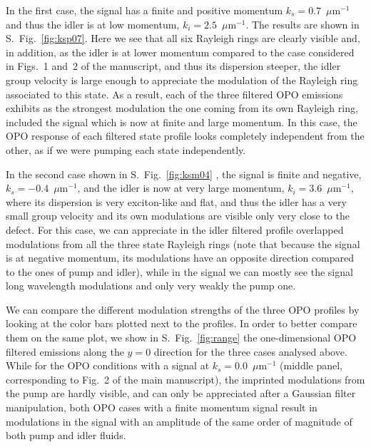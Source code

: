 In the first case, the signal has a finite and positive momentum $k_s
= 0.7$~$\mu$m$^{-1}$ and thus the idler is at low momentum, $k_i
=2.5$~$\mu$m$^{-1}$. The results are shown in S.~Fig.~\ref{fig:ksp07}.
%
Here we see that all six Rayleigh rings are clearly visible and, in
addition, as the idler is at lower momentum compared to the case
considered in Figs.~1 and~2 of the manuscript, and thus its dispersion
steeper, the idler group velocity is large enough to appreciate the
modulation of the Rayleigh ring associated to this state. As a result,
each of the three filtered OPO emissions exhibits as the strongest
modulation the one coming from its own Rayleigh ring, included the
signal which is now at finite and large momentum. In this case, the
OPO response of each filtered state profile looks completely
independent from the other, as if we were pumping each state
independently.

In the second case shown in S.~Fig.~\ref{fig:ksm04} , the signal is
finite and negative, $k_s = -0.4$~$\mu$m$^{-1}$, and the idler is now
at very large momentum, $k_i = 3.6$~$\mu$m$^{-1}$, where its
dispersion is very exciton-like and flat, and thus the idler has a
very small group velocity and its own modulations are visible only
very close to the defect. For this case, we can appreciate in the
idler filtered profile overlapped modulations from all the three state
Rayleigh rings (note that because the signal is at negative momentum,
its modulations have an opposite direction compared to the ones of
pump and idler), while in the signal we can mostly see the signal long
wavelength modulations and only very weakly the pump one.


We can compare the different modulation strengths of the three OPO
profiles by looking at the color bars plotted next to the profiles. In
order to better compare them on the same plot, we show in
S.~Fig.~\ref{fig:range} the one-dimensional OPO filtered emissions
along the $y=0$ direction for the three cases analysed above. While
for the OPO conditions with a signal at $k_s = 0.0$~$\mu$m$^{-1}$
(middle panel, corresponding to Fig.~2 of the main manuscript), the
imprinted modulations from the pump are hardly visible, and can only
be appreciated after a Gaussian filter manipulation, both OPO cases
with a finite momentum signal result in modulations in the signal with
an amplitude of the same order of magnitude of both pump and idler
fluids.

